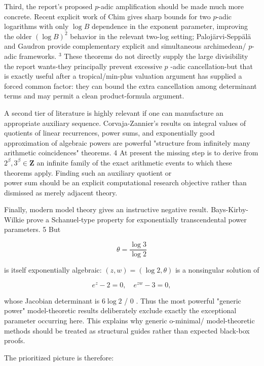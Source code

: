 \documentclass[10pt]{article}
\begin{document}
Third, the report's proposed $p$-adic amplification should be made much more concrete. Recent explicit work of Chim gives sharp bounds for two $p$-adic logarithms with only $\log B$ dependence in the exponent parameter, improving the older $(\log B)^{2}$ behavior in the relevant two-log setting; Palojärvi-Seppälä and Gaudron provide complementary explicit and simultaneous archimedean/ $p$-adic frameworks. ${ }^{3}$ These theorems do not directly supply the large divisibility the report wants-they principally prevent excessive $p$ -adic cancellation-but that is exactly useful after a tropical/min-plus valuation argument has supplied a forced common factor: they can bound the extra cancellation among determinant terms and may permit a clean product-formula argument.

A second tier of literature is highly relevant if one can manufacture an appropriate auxiliary sequence. Corvaja-Zannier's results on integral values of quotients of linear recurrences, power sums, and exponentially good approximation of algebraic powers are powerful "structure from infinitely many arithmetic coincidences" theorems. 4 At present the missing step is to derive from $2^{\beta}, 3^{\beta} \in \mathbf{Z}$ an infinite family of the exact arithmetic events to which these theorems apply. Finding such an auxiliary quotient or\\
power sum should be an explicit computational research objective rather than dismissed as merely adjacent theory.

Finally, modern model theory gives an instructive negative result. Bays-Kirby-Wilkie prove a Schanuel-type property for exponentially transcendental power parameters. 5 But

$$
\theta=\frac{\log 3}{\log 2}
$$

is itself exponentially algebraic: $(z, w)=(\log 2, \theta)$ is a nonsingular solution of

$$
e^{z}-2=0, \quad e^{z w}-3=0,
$$

whose Jacobian determinant is $6 \log 2$ / 0 . Thus the most powerful "generic power" model-theoretic results deliberately exclude exactly the exceptional parameter occurring here. This explains why generic o-minimal/ model-theoretic methods should be treated as structural guides rather than expected black-box proofs.

The prioritized picture is therefore:
\end{document}
